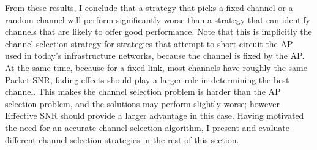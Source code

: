 From these results, I conclude that a strategy that picks a fixed channel or a random channel will perform significantly worse than a strategy that can identify channels that are likely to offer good performance. Note that this is implicitly the channel selection strategy for strategies that attempt to short-circuit the AP~\cite{Afanasyev_RTSid} used in today's infrastructure networks, because the channel is fixed by the AP. At the same time, because for a fixed link, most channels have roughly the same Packet SNR, fading effects should play a larger role in determining the best channel. This makes the channel selection problem is harder than the AP selection problem, and the solutions may perform slightly worse; however Effective SNR should provide a larger advantage in this case. Having motivated the need for an accurate channel selection algorithm, I present and evaluate different channel selection strategies in the rest of this section.

